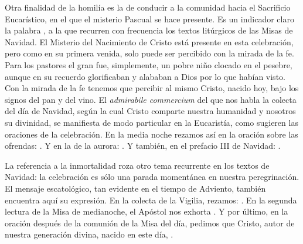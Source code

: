 Otra finalidad de la homilía es la de conducir a la comunidad hacia el Sacrificio Eucarístico, en el que el misterio Pascual se hace presente. Es un indicador claro la palabra , a la que recurren con frecuencia los textos litúrgicos de las Misas de Navidad. El Misterio del Nacimiento de Cristo está presente en esta celebración, pero como en su primera venida, solo puede ser percibido con la mirada de la fe. Para los pastores el gran  fue, simplemente, un pobre niño clocado en el pesebre, aunque en su recuerdo glorificaban y alababan a Dios por lo que habían visto. Con la mirada de la fe tenemos que percibir al mismo Cristo, nacido hoy, bajo los signos del pan y del vino. El \emph{admirabile commercium} del que nos habla la colecta del día de Navidad, según la cual Cristo comparte nuestra humanidad y nosotros su divinidad, se manifiesta de modo particular en la Eucaristía, como sugieren las oraciones de la celebración. En la media noche rezamos así en la oración sobre las ofrendas: . Y en la de la aurora: . Y también, en el prefacio III de Navidad: .

La referencia a la inmortalidad roza otro tema recurrente en los textos de Navidad: la celebración es sólo una parada momentánea en nuestra peregrinación. El mensaje escatológico, tan evidente en el tiempo de Adviento, también encuentra aquí su expresión. En la colecta de la Vigilia, rezamos: . En la segunda lectura de la Misa de medianoche, el Apóstol nos exhorta . Y por último, en la oración después de la comunión de la Misa del día, pedimos que Cristo, autor de nuestra generación divina, nacido en este día, .

